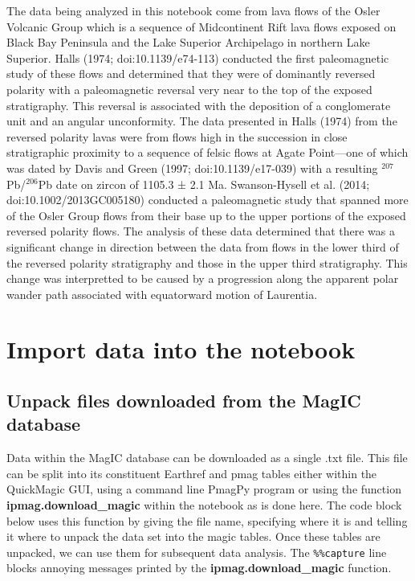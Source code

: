 \documentclass{article}
\begin{document}
    The data being analyzed in this notebook come from lava flows of the
Osler Volcanic Group which is a sequence of Midcontinent Rift lava flows
exposed on Black Bay Peninsula and the Lake Superior Archipelago in
northern Lake Superior. Halls (1974; doi:10.1139/e74-113) conducted the
first paleomagnetic study of these flows and determined that they were
of dominantly reversed polarity with a paleomagnetic reversal very near
to the top of the exposed stratigraphy. This reversal is associated with
the deposition of a conglomerate unit and an angular unconformity. The
data presented in Halls (1974) from the reversed polarity lavas were
from flows high in the succession in close stratigraphic proximity to a
sequence of felsic flows at Agate Point---one of which was dated by
Davis and Green (1997; doi:10.1139/e17-039) with a resulting
\(^{207}\)Pb/\(^{206}\)Pb date on zircon of 1105.3 ± 2.1 Ma.
Swanson-Hysell et al. (2014; doi:10.1002/2013GC005180) conducted a
paleomagnetic study that spanned more of the Osler Group flows from
their base up to the upper portions of the exposed reversed polarity
flows. The analysis of these data determined that there was a
significant change in direction between the data from flows in the lower
third of the reversed polarity stratigraphy and those in the upper third
stratigraphy. This change was interpretted to be caused by a progression
along the apparent polar wander path associated with equatorward motion
of Laurentia.

    \section{Import data into the
notebook}\label{import-data-into-the-notebook}

\subsection{Unpack files downloaded from the MagIC
database}\label{unpack-files-downloaded-from-the-magic-database}

Data within the MagIC database can be downloaded as a single .txt file.
This file can be split into its constituent Earthref and pmag tables
either within the QuickMagic GUI, using a command line PmagPy program or
using the function \textbf{ipmag.download\_magic} within the notebook as
is done here. The code block below uses this function by giving the file
name, specifying where it is and telling it where to unpack the data set
into the magic tables. Once these tables are unpacked, we can use them
for subsequent data analysis. The \texttt{\%\%capture} line blocks
annoying messages printed by the \textbf{ipmag.download\_magic}
function.
\end{document}
